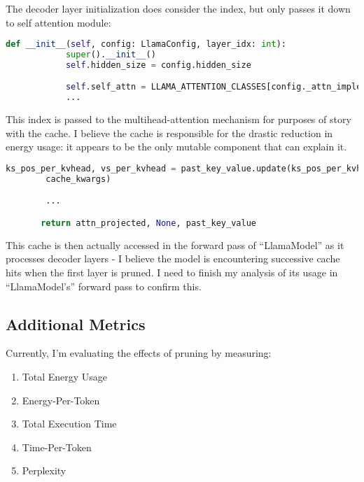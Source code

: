 \documentclass{article}
\begin{document}
    The decoder layer initialization does consider the index, but only passes it down to self attention module:

    \begin{lstlisting}[language=Python,label={lst:lstlisting2}]
        def __init__(self, config: LlamaConfig, layer_idx: int):
            super().__init__()
            self.hidden_size = config.hidden_size

            self.self_attn = LLAMA_ATTENTION_CLASSES[config._attn_implementation](config=config, layer_idx=layer_idx)
            ...
    \end{lstlisting}

    This index is passed to the multihead-attention mechanism for purposes of story with the cache.
    I believe the cache is responsible for the drastic reduction in energy usage: it appears to be the only mutable component that can explain it.

    \begin{lstlisting}[language=Python,label={lst:lstlisting3}]
        ks_pos_per_kvhead, vs_per_kvhead = past_key_value.update(ks_pos_per_kvhead, vs_per_kvhead, self.layer_idx,
        cache_kwargs)

        ...

       return attn_projected, None, past_key_value
    \end{lstlisting}

    This cache is then actually accessed in the forward pass of ``LlamaModel'' as it processes decoder layers - I believe the model is encountering successive cache hits when the first layer is pruned.
    I need to finish my analysis of its usage in ``LlamaModel's'' forward pass to confirm this.

    \subsection{Additional Metrics}

    Currently, I'm evaluating the effects of pruning by measuring:

    \begin{enumerate}
        \item Total Energy Usage
        \item Energy-Per-Token
        \item Total Execution Time
        \item Time-Per-Token
        \item Perplexity
    \end{enumerate}
\end{document}
